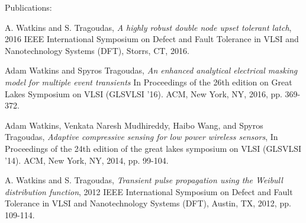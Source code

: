 \vspace{8pt}
Publications: 

A. Watkins and S. Tragoudas, \emph{A highly robust double node upset tolerant latch}, 2016 IEEE International Symposium on Defect and Fault Tolerance in VLSI and Nanotechnology Systems (DFT), Storrs, CT, 2016.

Adam Watkins and Spyros Tragoudas, \emph{An enhanced analytical electrical masking model for multiple event transients} In Proceedings of the 26th edition on Great Lakes Symposium on VLSI (GLSVLSI '16). ACM, New York, NY, 2016, pp. 369-372.

Adam Watkins, Venkata Naresh Mudhireddy, Haibo Wang, and Spyros Tragoudas, \emph{Adaptive compressive sensing for low power wireless sensors}, In Proceedings of the 24th edition of the great lakes symposium on VLSI (GLSVLSI '14). ACM, New York, NY, 2014, pp. 99-104.

A. Watkins and S. Tragoudas, \emph{Transient pulse propagation using the Weibull distribution function}, 2012 IEEE International Symposium on Defect and Fault Tolerance in VLSI and Nanotechnology Systems (DFT), Austin, TX, 2012, pp. 109-114.
